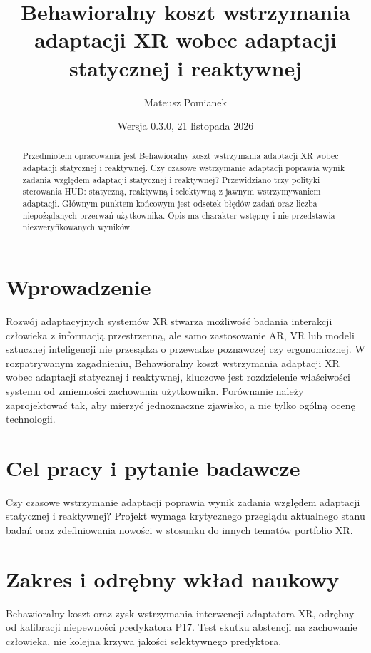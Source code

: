 \documentclass[11pt,a4paper]{article}
\title{Behawioralny koszt wstrzymania adaptacji XR wobec adaptacji statycznej i reaktywnej}
\author{Mateusz Pomianek}
\date{Wersja 0.3.0, 21 listopada 2026}
\begin{document}
\maketitle

\begin{abstract}

Przedmiotem opracowania jest Behawioralny koszt wstrzymania adaptacji XR wobec adaptacji statycznej i reaktywnej. Czy czasowe wstrzymanie adaptacji poprawia wynik zadania względem adaptacji statycznej i reaktywnej? Przewidziano trzy polityki sterowania HUD: statyczną, reaktywną i selektywną z jawnym wstrzymywaniem adaptacji. Głównym punktem końcowym jest odsetek błędów zadań oraz liczba niepożądanych przerwań użytkownika. Opis ma charakter wstępny i nie przedstawia niezweryfikowanych wyników.

\end{abstract}

\section{Wprowadzenie}

Rozwój adaptacyjnych systemów XR stwarza możliwość badania interakcji człowieka z informacją przestrzenną, ale samo zastosowanie AR, VR lub modeli sztucznej inteligencji nie przesądza o przewadze poznawczej czy ergonomicznej. W rozpatrywanym zagadnieniu, Behawioralny koszt wstrzymania adaptacji XR wobec adaptacji statycznej i reaktywnej, kluczowe jest rozdzielenie właściwości systemu od zmienności zachowania użytkownika. Porównanie należy zaprojektować tak, aby mierzyć jednoznaczne zjawisko, a nie tylko ogólną ocenę technologii.

\section{Cel pracy i pytanie badawcze}

Czy czasowe wstrzymanie adaptacji poprawia wynik zadania względem adaptacji statycznej i reaktywnej? Projekt wymaga krytycznego przeglądu aktualnego stanu badań oraz zdefiniowania nowości w stosunku do innych tematów portfolio XR.

\section{Zakres i odrębny wkład naukowy}
Behawioralny koszt oraz zysk wstrzymania interwencji adaptatora XR, odrębny od kalibracji niepewności predykatora P17. Test skutku abstencji na zachowanie człowieka, nie kolejna krzywa jakości selektywnego predyktora.
\end{document}
